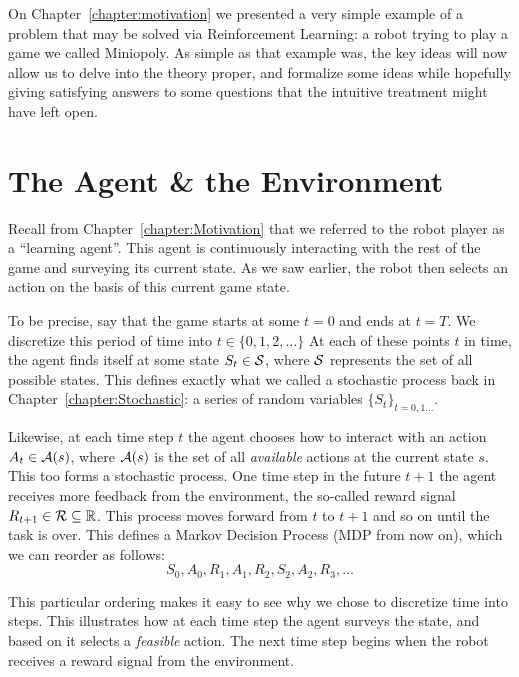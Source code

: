 
\label{chapter:ReinforcementLearning}

On Chapter~\ref{chapter:motivation} we presented a very simple 
example of a problem that may be solved via Reinforcement 
Learning: a robot trying to play a game we called Miniopoly. As 
simple as that example was, the key ideas will now allow us to 
delve into the theory proper, and formalize some ideas while 
hopefully giving satisfying answers to some questions that the 
intuitive treatment might have left open.

\section{The Agent \& the Environment}
Recall from Chapter~\ref{chapter:Motivation} that we referred 
to the robot player as a ``learning agent''. This agent is 
continuously interacting with the rest of the game and 
surveying its current state. As we saw earlier, the robot then 
selects an action on the basis of this current game state.

To be precise, say that the game starts at some $t=0$ and ends 
at $t=T$. We discretize this period of time into $t \in \{0, 1, 
2, \ldots \}$ At each of these points $t$ in time, the agent 
finds itself at some state $S_t \in \mathcal{S}$, where $\mathcal{S}$ 
represents the set of all possible states. This defines exactly 
what we called a stochastic process back in 
Chapter~\ref{chapter:Stochastic}: a series of random variables 
$\{ S_t \}_{t = 0, 1 \ldots}$. 

Likewise, at each time step $t$ the agent chooses how to 
interact with an action $A_t \in \mathcal{A}(s)$, where 
$\mathcal{A}(s)$ is the set of all \textit{available} actions at 
the current state $s$. This too forms a stochastic process. One 
time step in the future $t+1$ the agent receives more feedback 
from the environment, the so-called reward signal $R_{t+1} \in 
\mathcal{R} \subseteq \mathbb{R}$. This process moves forward from $t$ to 
$t+1$ and so on until the task is over. This defines a Markov 
Decision Process (MDP from now on), which we can reorder as 
follows:
\begin{equation}
	S_0, A_0, R_1, A_1, R_2, S_2, A_2, R_3, \ldots
\end{equation}

This particular ordering makes it easy to see why we chose to 
discretize time into steps. This illustrates how at each time 
step the agent surveys the state, and based on it selects a 
\textit{feasible} action. The next time step begins when the 
robot receives a reward signal from the environment. 

